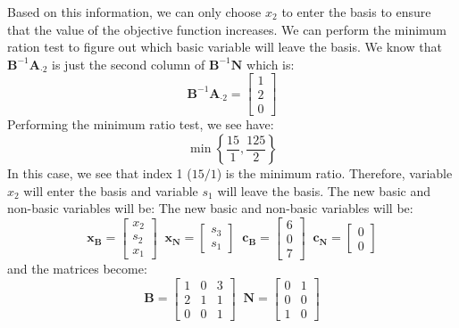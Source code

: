 \begin{example}
Based on this information, we can only choose $x_2$ to enter the basis to ensure that the value of the objective function increases. We can perform the minimum ration test to figure out which basic variable will leave the basis. We know that $\mathbf{B}^{-1}\mathbf{A}_{\cdot 2}$ is just the second column of $\mathbf{B}^{-1}\mathbf{N}$ which is:
\begin{displaymath}
\mathbf{B}^{-1}\mathbf{A}_{\cdot 2} = \begin{bmatrix}
1\\
2\\
0
\end{bmatrix}
\end{displaymath}
Performing the minimum ratio test, we see have:
\begin{displaymath}
\min\left\{\frac{15}{1},\frac{125}{2}\right\}
\end{displaymath}
In this case, we see that index 1 ($15/1$) is the minimum ratio. Therefore, variable $x_2$ will enter the basis and variable $s_1$ will leave the basis. The new basic and non-basic variables will be:
The new basic and non-basic variables will be:
\begin{displaymath}
\mathbf{x_B} = \begin{bmatrix}x_2\\s_2\\x_1\end{bmatrix}\;\;
\mathbf{x_N} = \begin{bmatrix}s_3\\s_1\end{bmatrix}\;\;
\mathbf{c_B} = \begin{bmatrix}6\\0\\7\end{bmatrix}\;\;
\mathbf{c_N} = \begin{bmatrix}0\\0\end{bmatrix}
\end{displaymath}
and the matrices become:
\begin{displaymath}
\mathbf{B} = \begin{bmatrix}
1 & 0 & 3\\
2 & 1 & 1\\
0 & 0 & 1
\end{bmatrix}\;\;
\mathbf{N} = \begin{bmatrix}
0 & 1\\
0 & 0\\
1 & 0
\end{bmatrix}

\end{displaymath}
\end{example}
